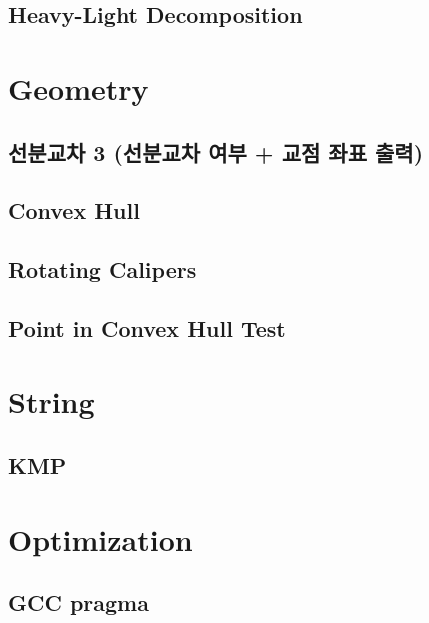 \documentclass[10pt,landscape,a4paper,twocolumn]{article}
\begin{document}
\subsection{Heavy-Light Decomposition}


\section{Geometry}

\subsection{선분교차 3 (선분교차 여부 + 교점 좌표 출력)}


\subsection{Convex Hull}


\subsection{Rotating Calipers}


\subsection{Point in Convex Hull Test}


\section{String}
\subsection{KMP}


\section{Optimization}
\subsection{GCC pragma}

\end{document}
